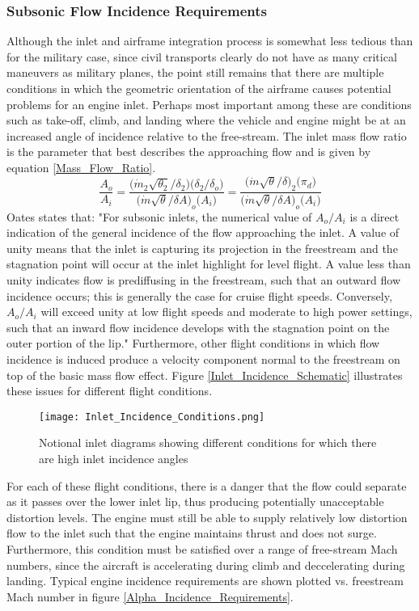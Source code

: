 \subsubsection{Subsonic Flow Incidence Requirements}
\indent Although the inlet and airframe integration process is somewhat less tedious than for the military case, since civil transports clearly do not have as many critical maneuvers as military planes, the point still remains that there are multiple conditions in which the geometric orientation of the airframe causes potential problems for an engine inlet.  Perhaps most important among these are conditions such as take-off, climb, and landing where the vehicle and engine might be at an increased angle of incidence relative to the free-stream.  The inlet mass flow ratio is the parameter that best describes the approaching flow and is given by equation \ref{Mass_Flow_Ratio}.
\begin{equation}
	\frac{A_o}
	        {A_i} = \frac{\Big(\dot{m}_2 \sqrt{\theta_2}/\delta_2\Big)\Big(\delta_2/\delta_o\Big)}{\Big(\dot{m}\sqrt{\theta}/\delta A\Big)_o\Big(A_i\Big)} = \frac{\Big(\dot{m}\sqrt{\theta}/\delta\Big)_2\Big(\pi_d\Big)}{\Big(\dot{m}\sqrt{\theta}/\delta A\Big)_o\Big(A_i\Big)}
			       {}
\label{Mass_Flow_Ratio}\end{equation}%
\indent Oates states that:  "For subsonic inlets, the numerical value of $A_o/A_i$ is a direct indication of the general incidence of the flow approaching the inlet.  A value of unity means that the inlet is capturing its projection in the freestream and the stagnation point will occur at the inlet highlight for level flight.  A value less than unity indicates flow is prediffusing in the freestream, such that an outward flow incidence occurs; this is generally the case for cruise flight speeds.  Conversely,$A_o/A_i$ will exceed unity at low flight speeds and moderate to high power settings, such that an inward flow incidence develops with the stagnation point on the outer portion of the lip."  Furthermore, other flight conditions in which flow incidence is induced produce a velocity component normal to the freestream on top of the basic mass flow effect.   Figure \ref{Inlet_Incidence_Schematic} illustrates these issues \cite{Oates1989} for different flight conditions.
	\begin{figure}[htpb]
	\centering
	\texttt{[image: Inlet\_Incidence\_Conditions.png]}
	\caption{Notional inlet diagrams showing different conditions for which there are high inlet incidence angles \cite{Oates1989}}
	\label{Circumferential_Distortion}
	\end{figure}
For each of these flight conditions, there is a danger that the flow could separate as it passes over the lower inlet lip, thus producing potentially unacceptable distortion levels.  The engine must still be able to supply relatively low distortion flow to the inlet such that the engine maintains thrust and does not surge.  Furthermore, this condition must be satisfied over a range of free-stream Mach numbers, since the aircraft is accelerating during climb and deccelerating during landing.  Typical engine incidence requirements are shown plotted vs. freestream Mach number in figure \ref{Alpha_Incidence_Requirements}.  

